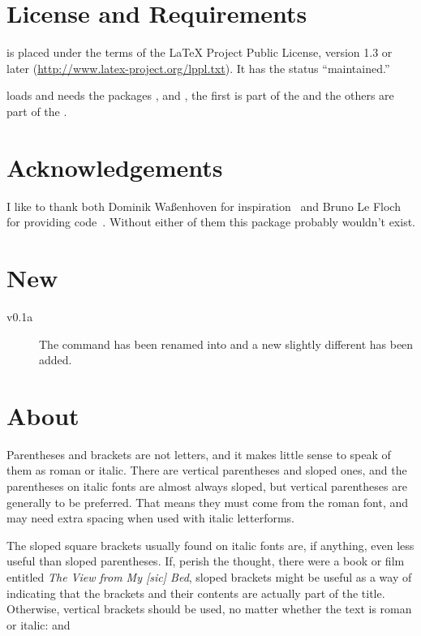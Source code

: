 \documentclass[DIV10,toc=index,toc=bib]{cnpkgdoc}
\begin{document}
\section{License and Requirements}
\embrac is placed under the terms of the LaTeX Project Public License,
version 1.3 or later (\url{http://www.latex-project.org/lppl.txt}).
It has the status ``maintained.''

\embrac loads and needs the packages ,  and
, the first is part of the  and the others are
part of the .

\section{Acknowledgements}
I like to thank both Dominik Waßenhoven for inspiration~\cite{dtk12-dw} and
Bruno Le Floch for providing code~\cite{lefloch11}. Without either of them this
package probably wouldn't exist.

\section{New}
\begin{description}
 \item[v0.1a] The command  has been renamed into
  and a new slightly different  has been added.
\end{description}

\section{About}\label{sec:about}
\begin{zitat}
 Parentheses and brackets are not letters, and it makes little sense to speak of
 them as roman or italic. There are vertical parentheses and sloped ones, and
 the parentheses on italic fonts are almost always sloped, but vertical parentheses
 are generally to be preferred. That means they must come from the roman font,
 and may need extra spacing when used with italic letterforms.
 
 The sloped square brackets usually found on italic fonts are, if anything, even
 less useful than sloped parentheses. If, perish the thought, there were a book
 or film entitled \emph*{The View from My [sic] Bed}, sloped brackets might be
 useful as a way of indicating that the brackets and their contents are actually
 part of the title. Otherwise, vertical brackets should be used, no matter whether
 the text is roman or italic:  and
\end{zitat}
\end{document}
